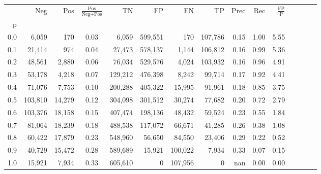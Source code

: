 \begin{tabular}{rrrcrrrrrrrrrrr}
\toprule
{} &      Neg &     Pos & $\frac{\text{Pos}}{\text{Neg}+\text{Pos}}$ &       TN &       FP &       FN &       TP &  Prec &   Rec & $\frac{\text{FP}}{\text{P}}$ \\
p   &          &         &                                            &          &          &          &          &       &       &                              \\
\midrule
0.0 &    6,059 &     170 &                                       0.03 &    6,059 &  599,551 &      170 &  107,786 &  0.15 &  1.00 &                         5.55 \\
0.1 &   21,414 &     974 &                                       0.04 &   27,473 &  578,137 &    1,144 &  106,812 &  0.16 &  0.99 &                         5.36 \\
0.2 &   48,561 &   2,880 &                                       0.06 &   76,034 &  529,576 &    4,024 &  103,932 &  0.16 &  0.96 &                         4.91 \\
0.3 &   53,178 &   4,218 &                                       0.07 &  129,212 &  476,398 &    8,242 &   99,714 &  0.17 &  0.92 &                         4.41 \\
0.4 &   71,076 &   7,753 &                                       0.10 &  200,288 &  405,322 &   15,995 &   91,961 &  0.18 &  0.85 &                         3.75 \\
0.5 &  103,810 &  14,279 &                                       0.12 &  304,098 &  301,512 &   30,274 &   77,682 &  0.20 &  0.72 &                         2.79 \\
0.6 &  103,376 &  18,158 &                                       0.15 &  407,474 &  198,136 &   48,432 &   59,524 &  0.23 &  0.55 &                         1.84 \\
0.7 &   81,064 &  18,239 &                                       0.18 &  488,538 &  117,072 &   66,671 &   41,285 &  0.26 &  0.38 &                         1.08 \\
0.8 &   60,422 &  17,879 &                                       0.23 &  548,960 &   56,650 &   84,550 &   23,406 &  0.29 &  0.22 &                         0.52 \\
0.9 &   40,729 &  15,472 &                                       0.28 &  589,689 &   15,921 &  100,022 &    7,934 &  0.33 &  0.07 &                         0.15 \\
1.0 &   15,921 &   7,934 &                                       0.33 &  605,610 &        0 &  107,956 &        0 &   nan &  0.00 &                         0.00 \\
\bottomrule
\end{tabular}
